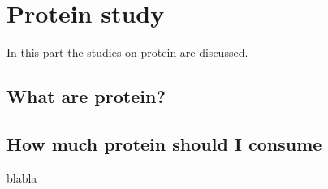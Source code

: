 \section{Protein study}

In this part the studies on protein are discussed. 

\subsection{What are protein?}

\subsection{How much protein should I consume}

blabla
\textcite{Weinert2009}
